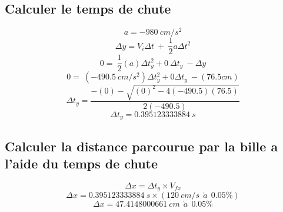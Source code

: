 \documentclass{article}
\begin{document}
            \subsection{Calculer le temps de chute}
                \setcounter{equation}{0}
                \vspace{5mm}
                \vspace{5mm}
                \begin{equation}
                    a = -980 \ cm/s^2
                \end{equation}
                \vspace{5mm}
                \begin{equation}
                    \Delta y = V_i \Delta t \ + \ \frac{1}{2} a \Delta t ^2
                \end{equation}
               \vspace{5mm}
                \begin{equation}
                    0 = \ \frac{1}{2}(a) \Delta t_y ^2 + 0 \ \Delta t_y \  - \Delta y
                \end{equation}
                \vspace{5mm}
                \begin{equation}
                    0 = \ (-490.5 \ cm/s^2) \Delta t_y ^2 + 0\Delta t_y \  - (76.5cm)
                \end{equation}
                \vspace{5mm}
                \begin{equation}
                    \Delta t_y = \frac{-(0)-\sqrt{(0)^2 - 4(-490.5)(76.5)}}{2(-490.5)}
                \end{equation}
                \vspace{5mm}
                \begin{equation}
                    \Delta t_y = 0.395123333884 \ s
                \end{equation}
                \vspace{5mm}
            \subsection{Calculer la distance parcourue par la bille a l'aide du temps de chute}
                \vspace{5mm}
                \begin{equation}
                    \Delta x = \Delta t_y \times V_{fx}
                \end{equation}
                \vspace{5mm}
                \begin{equation}
                    \Delta x = 0.395123333884 \ s \times ( 120 \ cm/s \ \ \grave{a} \ \ 0.05 \%)
                \end{equation}
                \vspace{5mm}
                \begin{equation}
                    \Delta x = 47.4148000661 \ cm \ \ \grave{a} \ \ 0.05 \%
                \end{equation}
\end{document}

